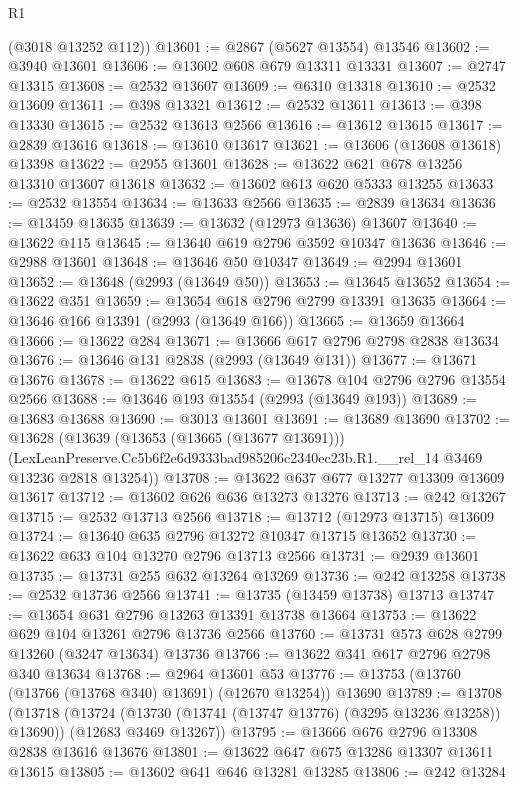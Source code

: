 \begin{lexlean}{R1}
\begin{coremodule}
      (@3018 @13252 @112))
@13601 := @2867 (@5627 @13554) @13546
@13602 := @3940 @13601
@13606 := @13602 @608 @679 @13311 @13331
@13607 := @2747 @13315
@13608 := @2532 @13607
@13609 := @6310 @13318
@13610 := @2532 @13609
@13611 := @398 @13321
@13612 := @2532 @13611
@13613 := @398 @13330
@13615 := @2532 @13613 @2566
@13616 := @13612 @13615
@13617 := @2839 @13616
@13618 := @13610 @13617
@13621 := @13606 (@13608 @13618) @13398
@13622 := @2955 @13601
@13628 := @13622 @621 @678 @13256 @13310 @13607 @13618
@13632 := @13602 @613 @620 @5333 @13255
@13633 := @2532 @13554
@13634 := @13633 @2566
@13635 := @2839 @13634
@13636 := @13459 @13635
@13639 := @13632 (@12973 @13636) @13607
@13640 := @13622 @115
@13645 := @13640 @619 @2796 @3592 @10347 @13636
@13646 := @2988 @13601
@13648 := @13646 @50 @10347
@13649 := @2994 @13601
@13652 := @13648 (@2993 (@13649 @50))
@13653 := @13645 @13652
@13654 := @13622 @351
@13659 := @13654 @618 @2796 @2799 @13391 @13635
@13664 := @13646 @166 @13391 (@2993 (@13649 @166))
@13665 := @13659 @13664
@13666 := @13622 @284
@13671 := @13666 @617 @2796 @2798 @2838 @13634
@13676 := @13646 @131 @2838 (@2993 (@13649 @131))
@13677 := @13671 @13676
@13678 := @13622 @615
@13683 := @13678 @104 @2796 @2796 @13554 @2566
@13688 := @13646 @193 @13554 (@2993 (@13649 @193))
@13689 := @13683 @13688
@13690 := @3013 @13601
@13691 := @13689 @13690
@13702 := @13628
    (@13639
      (@13653 (@13665 (@13677 @13691)))
      (LexLeanPreserve.Cc5b6f2e6d9333bad985206c2340ec23b.R1.__rel_14 @3469 @13236 @2818 @13254))
@13708 := @13622 @637 @677 @13277 @13309 @13609 @13617
@13712 := @13602 @626 @636 @13273 @13276
@13713 := @242 @13267
@13715 := @2532 @13713 @2566
@13718 := @13712 (@12973 @13715) @13609
@13724 := @13640 @635 @2796 @13272 @10347 @13715 @13652
@13730 := @13622 @633 @104 @13270 @2796 @13713 @2566
@13731 := @2939 @13601
@13735 := @13731 @255 @632 @13264 @13269
@13736 := @242 @13258
@13738 := @2532 @13736 @2566
@13741 := @13735 (@13459 @13738) @13713
@13747 := @13654 @631 @2796 @13263 @13391 @13738 @13664
@13753 := @13622 @629 @104 @13261 @2796 @13736 @2566
@13760 := @13731 @573 @628 @2799 @13260 (@3247 @13634) @13736
@13766 := @13622 @341 @617 @2796 @2798 @340 @13634
@13768 := @2964 @13601 @53
@13776 := @13753 (@13760 (@13766 (@13768 @340) @13691) (@12670 @13254)) @13690
@13789 := @13708
    (@13718
      (@13724 (@13730 (@13741 (@13747 @13776) (@3295 @13236 @13258)) @13690))
      (@12683 @3469 @13267))
@13795 := @13666 @676 @2796 @13308 @2838 @13616 @13676
@13801 := @13622 @647 @675 @13286 @13307 @13611 @13615
@13805 := @13602 @641 @646 @13281 @13285
@13806 := @242 @13284

\end{coremodule}
\end{lexlean}
